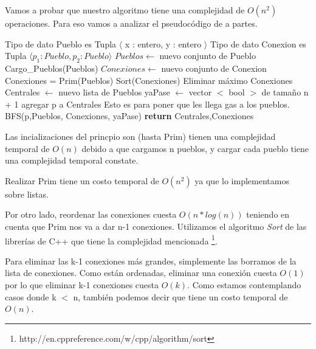 Vamos a probar que nuestro algoritmo tiene una complejidad de $O(n^2)$ operaciones. Para eso vamos a analizar el pseudocódigo de a partes.

\begin{center}
\begin{pseudo}
\State Tipo de dato Pueblo es Tupla $\langle$ x : entero, y : entero $\rangle$
\State Tipo de dato Conexion es Tupla $\langle p_1 : Pueblo, p_2 : Pueblo \rangle$
        \State $Pueblos \leftarrow$ nuevo conjunto de Pueblo 
        \State Cargo\_Pueblos(Pueblos) 
        \State $Conexiones \leftarrow$ nuevo conjunto de Conexion 
        \State Conexiones = Prim(Pueblos) 
        \State Sort(Conexiones) 
         
	  \State Eliminar máximo Conexiones 
	\EndFor
        \State Centrales $\leftarrow$ nuevo lista de Pueblos 
        \State yaPase $\leftarrow$ vector $<$ bool $>$ de tamaño n + 1 
         
         
        \State agregar p a Centrales 
        \Comment Esto es para poner que les llega gas a los pueblos.
        \State BFS(p,Pueblos, Conexiones, yaPase) 
        \EndIf
        \EndFor
        \State \textbf{return} Centrales,Conexiones 
    \EndProcedure
\end{pseudo}
\end{center}

Las incializaciones del princpio son (hasta Prim) tienen una complejidad temporal de $O(n)$ debido a que cargamos n pueblos, y cargar cada pueblo tiene una complejidad temporal constate.

Realizar Prim tiene un costo temporal de $O(n^2)$ ya que lo implementamos sobre listas.

Por otro lado, reordenar las conexiones cuesta $O(n*log(n))$ teniendo en cuenta que Prim nos va a dar n-1 conexiones. Utilizamos el algoritmo \emph{Sort} de las librerías de C++ que tiene la complejidad mencionada \footnote{http://en.cppreference.com/w/cpp/algorithm/sort}.

Para eliminar las k-1 conexiones más grandes, simplemente las borramos de la lista de conexiones. Como están ordenadas, eliminar una conexión cuesta $O(1)$ por lo que eliminar k-1 conexiones cuesta $O(k)$. Como estamos contemplando casos donde k  $<$ n, también podemos decir que tiene un costo temporal de $O(n)$.

